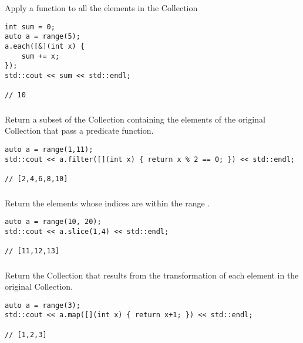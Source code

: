 Apply a function to all the elements in the Collection

\begin{lstlisting}[title=example]
int sum = 0;
auto a = range(5);
a.each([&](int x) {
    sum += x;
});
std::cout << sum << std::endl;

// 10
\end{lstlisting}




\subsubsection{}

Return a subset of the Collection containing the elements of the original Collection that pass a predicate function.

\begin{lstlisting}[title=example]
auto a = range(1,11);
std::cout << a.filter([](int x) { return x % 2 == 0; }) << std::endl;

// [2,4,6,8,10]
\end{lstlisting}




\subsubsection{}

Return the elements whose indices are within the range \code{[low, high)}.

\begin{lstlisting}[title=example]
auto a = range(10, 20);
std::cout << a.slice(1,4) << std::endl;

// [11,12,13]
\end{lstlisting}





\subsubsection{}

Return the Collection that results from the transformation of each element in the original Collection.

\begin{lstlisting}[title=example]
auto a = range(3);
std::cout << a.map([](int x) { return x+1; }) << std::endl;

// [1,2,3]
\end{lstlisting}




